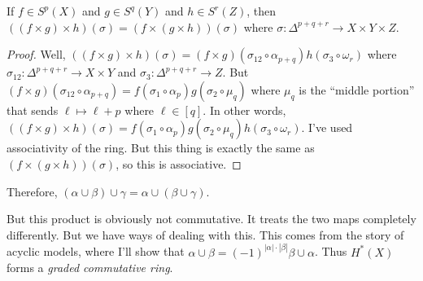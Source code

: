 \begin{prop}
If $f\in S^p(X)$ and $g\in S^q(Y)$ and $h\in S^r(Z)$, then $((f\times g)\times h)(\sigma)=(f\times(g\times h))(\sigma)$ where $\sigma:\Delta^{p+q+r}\to X\times Y\times Z$.
\end{prop}
\begin{proof}
Well, $((f\times g)\times h)(\sigma)=(f\times g)(\sigma_{12}\circ\alpha_{p+q})h(\sigma_3\circ\omega_r)$ where $\sigma_{12}:\Delta^{p+q+r}\to X\times Y$ and $\sigma_3:\Delta^{p+q+r}\to Z$. But $(f\times g)(\sigma_{12}\circ\alpha_{p+q})=f(\sigma_1\circ\alpha_p)g(\sigma_2\circ\mu_q)$ where $\mu_q$ is the ``middle portion'' that sends $\ell\mapsto \ell+p$ where $\ell\in[q]$. In other words, $((f\times g)\times h)(\sigma)=f(\sigma_1\circ\alpha_p)g(\sigma_2\circ\mu_q)h(\sigma_3\circ\omega_r)$. I've used associativity of the ring. But this thing is exactly the same as $(f\times(g\times h))(\sigma)$, so this is associative.
\end{proof}
Therefore, $(\alpha\cup\beta)\cup\gamma=\alpha\cup(\beta\cup\gamma)$.

But this product is obviously not commutative. It treats the two maps completely differently. But we have ways of dealing with this. This comes from the story of acyclic models, where I'll show that $\alpha\cup\beta=(-1)^{|\alpha|\cdot|\beta|}\beta\cup\alpha$. Thus $ H^\ast(X)$ forms a \emph{graded commutative ring}.
